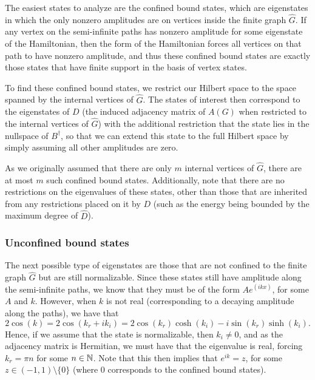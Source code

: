 \documentclass[../thesis-main/thesis-main]{subfiles}
\begin{document}
The easiest states to analyze are the confined bound states, which are eigenstates in which the only nonzero amplitudes are on vertices inside the finite graph $\widehat{G}$. If any vertex on the semi-infinite paths has nonzero amplitude for some eigenstate of the Hamiltonian, then the form of the Hamiltonian forces all vertices on that path to have nonzero amplitude, and thus these confined bound states are exactly those states that have finite support in the basis of vertex states.  

To find these confined bound states, we restrict our Hilbert space to the space spanned by the internal vertices of $\widehat{G}$. The states of interest then correspond to the eigenstates of $D$ (the induced adjacency matrix of $A(G)$ when restricted to the internal vertices of $\widehat{G}$) with the additional restriction that the state lies in the nullspace of $B^\dag$, so that we can extend this state to the full Hilbert space by simply assuming all other amplitudes are zero.    

As we originally assumed that there are only $m$ internal vertices of $\widehat{G}$, there are at most $m$ such confined bound states.  Additionally, note that there are no restrictions on the eigenvalues of these states, other than those that are inherited from any restrictions placed on it by $D$ (such as the energy being bounded by the maximum degree of $\widehat{D}$).

\subsubsection{Unconfined bound states}

The next possible type of eigenstates are those that are not confined to the finite graph $\widehat{G}$ but are still normalizable.  Since these states still have amplitude along the semi-infinite paths, we know that they must be of the form $Ae^(i k x)$, for some $A$ and $k$.  However, when $k$ is not real (corresponding to a decaying amplitude along the paths), we have that
\begin{equation}
  2 \cos(k) = 2\cos(k_r + i k_i) = 2 \cos(k_r) \cosh(k_i) - i \sin(k_r) \sinh(k_i).
\end{equation}
Hence, if we assume that the state is normalizable, then $k_i \neq 0$, and as the adjacency matrix is Hermitian, we must have that the eigenvalue is real, forcing $k_r = \pi n$ for some $n\in \mathbb{N}$.  Note that this then implies that $e^{i k} = z$, for some $z\in(-1,1)\setminus\{0\}$ (where $0$ corresponds to the confined bound states).
\end{document}
